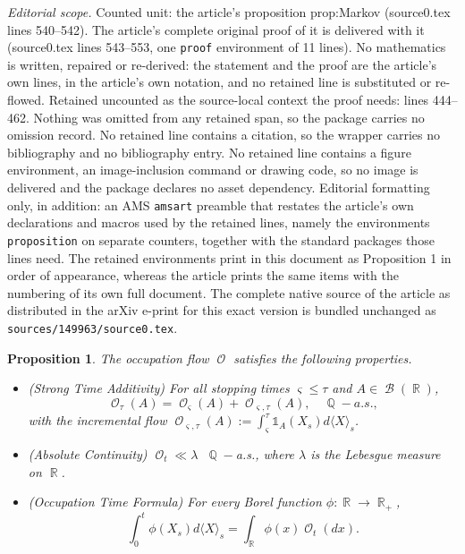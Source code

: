 \documentclass[10pt,a4paper]{amsart}
\newtheorem{proposition}{Proposition}
\DeclareMathOperator{\Q}{\mathbb{Q}}
\DeclareMathOperator{\R}{\mathbb{R}}
\DeclareMathOperator{\calB}{\mathcal{B}}
\DeclareMathOperator{\calO}{\mathcal{O}}
\begin{document}
\noindent\textit{Editorial scope.} Counted unit: the article's proposition prop:Markov (source0.tex lines 540--542). The article's complete original proof of it is delivered with it (source0.tex lines 543--553, one \texttt{proof} environment of 11 lines). No mathematics is written, repaired or re-derived: the statement and the proof are the article's own lines, in the article's own notation, and no retained line is substituted or re-flowed.  Retained uncounted as the source-local context the proof needs: lines 444--462.  Nothing was omitted from any retained span, so the package carries no omission record.  No retained line contains a citation, so the wrapper carries no bibliography and no bibliography entry.  No retained line contains a figure environment, an image-inclusion command or drawing code, so no image is delivered and the package declares no asset dependency.  Editorial formatting only, in addition: an AMS \texttt{amsart} preamble that restates the article's own declarations and macros used by the retained lines, namely the environments \texttt{proposition} on separate counters, together with the standard packages those lines need.  The retained environments print in this document as Proposition 1 in order of appearance, whereas the article prints the same items with the numbering of its own full document.  The complete native source of the article as distributed in the arXiv e-print for this exact version is bundled unchanged as \texttt{sources/149963/source0.tex}.
\begin{proposition}\label{prop:OccProperties} 
The occupation flow $\calO$ satisfies the following properties. 
    \begin{itemize}
        \item[\textnormal{I.}] \textnormal{(Strong Time Additivity)} 
        For all stopping times $\varsigma \le \tau$ and $A \in \calB(\R)$,  
\begin{equation}\label{eq:additive}
    \calO_{\tau}(A) = \calO_{\varsigma}(A) + \calO_{\varsigma,\tau}(A), \quad \Q-a.s., 
\end{equation}
with the incremental flow
$\calO_{\varsigma,\tau}(A) := \int_\varsigma^\tau \mathds{1}_{A}(X_s)d\langle X \rangle_s$. 

        \item[\textnormal{II.}] \textnormal{(Absolute Continuity)} $\calO_t \ll \lambda$ $ \ \Q-$a.s., where $\lambda$ is the Lebesgue measure on $\R$. 
             \item[\textnormal{III.}] \textnormal{(Occupation Time Formula)} For every Borel function $\phi:\R\to \R_{+}$, 
\begin{equation}\label{eq:OTF}
    \int_0^t \phi(X_s)d\langle X \rangle_s = \int_{\R} \phi(x)\calO_t(dx).  
\end{equation}
             
    \end{itemize}
\end{proposition}
\end{document}

